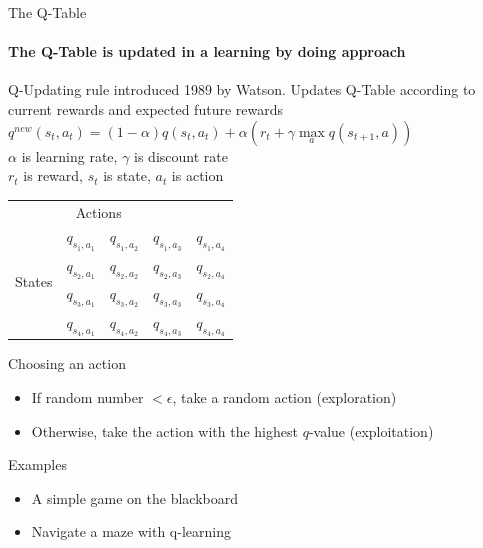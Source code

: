 \documentclass[color=usenames,dvipsnames]{beamer}
\begin{document}
\begin{frame}{The Q-Table}
\framesubtitle{The Q-Table is updated in a learning by doing approach}

Q-Updating rule introduced 1989 by Watson. Updates Q-Table according to current rewards and expected future rewards\\

$q^{new}(s_t,a_t)=(1-\alpha)q(s_t,a_t) + \alpha (r_t + \gamma \max\limits_{a} q(s_{t+1},a))$\\

$\alpha$ is learning rate, $\gamma$ is discount rate\\
$r_t$ is reward, $s_t$ is state, $a_t$ is action\\
\begin{table}

\begin{tabular}{lllll}
	\multicolumn{4}{c}{Actions}\\
	\multirow{4}{*}{States}		& $q_{s_1,a_1}$ & $q_{s_1,a_2}$ & $q_{s_1,a_3}$  & $q_{s_1,a_4}$\\
	& $q_{s_2,a_1}$ & $q_{s_2,a_2}$ & $q_{s_2,a_3}$  & $q_{s_2,a_4}$\\
	& $q_{s_3,a_1}$ & $q_{s_3,a_2}$ & $q_{s_3,a_3}$  & $q_{s_3,a_4}$\\
	& $q_{s_4,a_1}$ & $q_{s_4,a_2}$ & $q_{s_4,a_3}$  & $q_{s_4,a_4}$\\
\end{tabular}
\end{table}

\end{frame}

\begin{frame}{Choosing an action}

\begin{itemize}
\item If random number $<\epsilon$, take a random action (exploration)
\item Otherwise, take the action with the highest $q$-value (exploitation)
\end{itemize}

\end{frame}

\begin{frame}{Examples}

\begin{itemize}
	\item A simple game on the blackboard
	\item Navigate a maze with q-learning
\end{itemize}

\end{frame}
\end{document}
